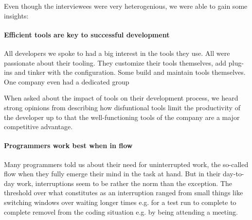 Even though the interviewees were very heterogenious, we were able to gain some insights:

\paragraph{Efficient tools are key to successful development} All developers we spoke to had a big interest in the tools they use. All were passionate about their tooling. They customize their tools themselves, add plug-ins and tinker with the configuration. Some build and maintain tools themselves. One company even had a dedicated group

When asked about the impact of tools on their development process, we heard strong opinions from describing how disfuntional tools limit the productivity of the developer up to that the well-functioning tools of the company are a major competitive advantage.

\paragraph{Programmers work best when in flow} Many programmers told us about their need for uninterrupted work, the so-called flow when they fully emerge their mind in the task at hand. But in their day-to-day work, interruptions seem to be rather the norm than the exception. The threshold over what constitutes as an interruption ranged from small things like switching windows over waiting longer times e.g. for a test run to complete to complete removel from the coding situation e.g. by being attending a meeting.
